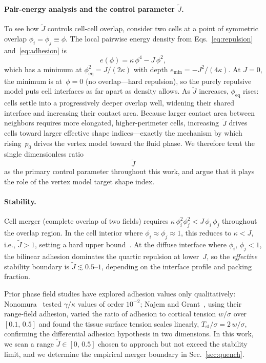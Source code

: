 \documentclass[aps,pre,twocolumn,superscriptaddress,longbibliography]{revtex4-2}
\newcommand{\Jk}{\tilde{J}}                %
\newcommand{\phii}{\phi_i}                 %
\newcommand{\phij}{\phi_j}                 %
\begin{document}
\paragraph{Pair-energy analysis and the control parameter $\Jk$.}
To see how $\Jk$ controls cell-cell overlap, consider two cells at
a point of symmetric overlap $\phii = \phij \equiv \phi$.  The local
pairwise energy density from Eqs.~\eqref{eq:repulsion}
and~\eqref{eq:adhesion} is
%
\begin{equation}
  e(\phi) = \kappa\,\phi^4 - J\,\phi^2,
  \label{eq:pair-energy}
\end{equation}
%
which has a minimum at $\phi_{\mathrm{eq}}^2 = J/(2\kappa)$ with depth
$e_{\min} = -J^2/(4\kappa)$.  At $J = 0$, the minimum is at~$\phi = 0$
(no overlap---hard repulsion), so the purely repulsive model
\cite{Palmieri2015,Loewe2020} puts cell interfaces as far apart as density
allows.  As $\Jk$ increases, $\phi_{\mathrm{eq}}$ rises: cells settle into
a progressively deeper overlap well, widening their shared interface and
increasing their contact area.  Because larger contact area between
neighbors requires more elongated, higher-perimeter cells, increasing~$\Jk$
drives cells toward larger effective shape indices---exactly the mechanism by
which rising~$p_0$ drives the vertex model toward the fluid phase.
We therefore treat the single dimensionless ratio
%
\begin{equation}
  \Jk
  \label{eq:jk-ratio}
\end{equation}
%
as the primary control parameter throughout this work, and argue that it
plays the role of the vertex model target shape index.

\paragraph{Stability.}
Cell merger (complete overlap of two fields) requires
$\kappa\,\phii^2\phij^2 < J\,\phii\,\phij$ throughout the overlap region.
In the cell interior where $\phii \approx \phij \approx 1$, this reduces to
$\kappa < J$, i.e., $\Jk > 1$, setting a hard upper
bound~\cite{Nonomura2012}.  At the diffuse interface where
$\phii,\,\phij < 1$, the bilinear adhesion dominates the quartic repulsion
at lower~$J$, so the \emph{effective} stability boundary is
$\Jk \lesssim 0.5$--$1$, depending on the interface profile and packing
fraction.

Prior phase field studies have explored adhesion values only qualitatively:
Nonomura~\cite{Nonomura2012} tested $\gamma/\kappa$ values of order $10^{-2}$;
Najem and Grant~\cite{Najem2016}, using their range-field adhesion,
varied the ratio of adhesion to cortical tension $w/\sigma$ over~$[0.1,\,0.5]$
and found the tissue surface tension scales linearly,
$T_{\mathrm{st}}/\sigma = 2\,w/\sigma$, confirming the differential adhesion
hypothesis in two dimensions.
In this work, we scan a range $\Jk \in [0,\,0.5]$ chosen to approach
but not exceed the stability limit, and we determine the empirical merger
boundary in Sec.~\ref{sec:quench}.
\end{document}

